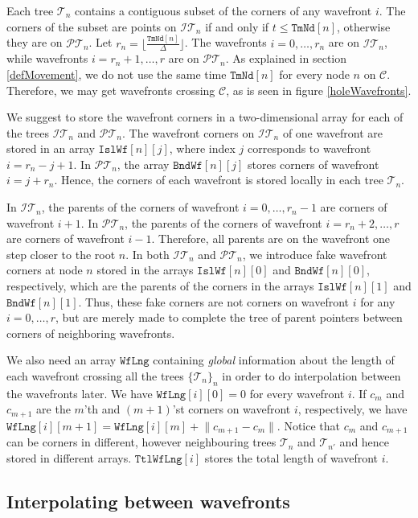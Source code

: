 \documentclass[3p]{elsarticle}
\newcommand{\PP}{\mathcal{P}}
\newcommand{\HH}{\mathcal{I}}
\newcommand{\CC}{\mathcal{C}}
\newcommand{\TT}{\mathcal{T}}
\newcommand{\PT}{\PP\TT}
\newcommand{\HT}{\HH\TT}
\newcommand{\tStepover}{\Delta}
\newcommand{\ttimeO}{\texttt{TmNd}}
\newcommand{\wavefront}{\texttt{Wf}}
\newcommand{\holeWavefront}{\texttt{Isl}\wavefront}
\newcommand{\boundaryWavefront}{\texttt{Bnd}\wavefront}
\newcommand{\wavefrontLength}{\wavefront\texttt{Lng}}
\newcommand{\totalWavefrontLength}{\texttt{Ttl}\wavefrontLength}
\begin{document}
Each tree $\TT_n$ contains a contiguous subset of the
corners of any wavefront $i$. The corners of the subset are
points on $\HT_n$ if and only if $t\leq \ttimeO[n]$, otherwise they are on $\PT_n$.
Let $r_{n}=\lfloor\frac{\ttimeO[n]}{\tStepover}\rfloor$.
The wavefronts $i=0,\ldots,r_{n}$ are on
$\HT_n$, while wavefronts $i=r_{n}+1,\ldots, r$ are on
$\PT_n$.
As explained in section \ref{defMovement}, we do not use the same time $\ttimeO[n]$ for every
node $n$ on $\CC$. Therefore, we may get wavefronts crossing $\CC$, as
is seen in figure \ref{holeWavefronts}.

We suggest to store the wavefront corners in a two-dimensional array for each of the trees
$\HT_n$ and $\PT_n$.
The wavefront corners on $\HT_n$ of one wavefront are stored in an array $\holeWavefront[n][j]$,
where index $j$ corresponds to wavefront $i=r_{n}-j+1$.
In $\PT_n$, the array $\boundaryWavefront[n][j]$ stores corners of
wavefront $i=j+r_{n}$.
Hence, the corners of each wavefront is stored locally in each tree $\TT_n$.

In $\HT_n$, the parents of the corners of wavefront $i=0,\ldots,r_{n}-1$
are corners of wavefront $i+1$. In $\PT_n$, the parents of the corners of wavefront
$i=r_{n}+2,\ldots, r$ are corners of wavefront $i-1$.
Therefore, all parents are on the
wavefront one step closer to the root $n$.
In both $\HT_n$ and $\PT_n$, we introduce fake wavefront corners
at node $n$ stored in the arrays $\holeWavefront[n][0]$ and $\boundaryWavefront[n][0]$,
respectively, which are the parents of the corners in
the arrays $\holeWavefront[n][1]$ and $\boundaryWavefront[n][1]$.
Thus, these fake corners are not corners on wavefront $i$ for any $i=0,\ldots, r$, but are merely
made to complete the tree of parent pointers between corners of neighboring wavefronts.

We also need an array $\wavefrontLength$ containing \emph{global} information about the length
of each wavefront crossing all the trees $\{\TT_{n}\}_n$ in order to do interpolation between
the wavefronts later. We have
$\wavefrontLength[i][0]=0$ for every wavefront $i$.
If $c_m$ and $c_{m+1}$ are the $m$'th and $(m+1)$'st corners on
wavefront $i$, respectively, we have
$\wavefrontLength[i][m+1]=\wavefrontLength[i][m] +
\lVert c_{m+1} - c_m \rVert$. Notice that $c_m$ and $c_{m+1}$ can be corners
in different, however neighbouring trees $\TT_n$ and $\TT_{n'}$ and hence stored in
different arrays.
$\totalWavefrontLength[i]$ stores the total length of wavefront $i$.

\subsection{Interpolating between wavefronts}\label{interpolWithIsland}
\end{document}
